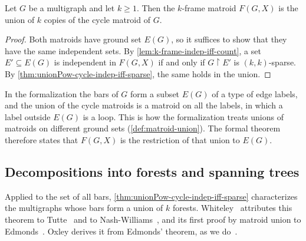 \begin{theorem}
  \label{thm:k-frame-union-cycle}
  \leanok
  Let $G$ be a multigraph and let $k \ge 1$. Then the $k$-frame matroid
  $F(G, X)$ is the union of $k$ copies of the cycle matroid of $G$.
\end{theorem}
\begin{proof}
  \leanok
  Both matroids have ground set $E(G)$, so it suffices to show that they
  have the same independent sets. By \cref{lem:k-frame-indep-iff-count},
  a set $E' \subseteq E(G)$ is independent in $F(G, X)$ if and only if
  $G \restriction E'$ is $(k, k)$-sparse. By
  \cref{thm:unionPow-cycle-indep-iff-sparse}, the same holds in the
  union.
\end{proof}
\begin{fmlnote}
  \label{fmlnote:k-frame-union-restriction}
  In the formalization the bars of $G$ form a subset $E(G)$ of a type
  of edge labels, and the union of the cycle matroids is a matroid on
  all the labels, in which a label outside $E(G)$ is a loop. This is how
  the formalization treats unions of matroids on different ground sets
  (\cref{def:matroid-union}). The formal theorem therefore states that
  $F(G, X)$ is the restriction of that union to $E(G)$.
\end{fmlnote}

\subsection{Decompositions into forests and spanning trees}
\label{sec:body-bar-tree-packing}

Applied to the set of all bars, \cref{thm:unionPow-cycle-indep-iff-sparse}
characterizes the multigraphs whose bars form a union of $k$ forests.
Whiteley~\cite[remark after Corollary~3]{whiteley1988} attributes this
theorem to Tutte~\cite{tutte1961} and to
Nash-Williams~\cite{nashWilliams1961,nashWilliams1964}, and its first
proof by matroid union to Edmonds~\cite{edmonds1965}. Oxley derives it
from Edmonds' theorem, as we do~\cite[Proposition~11.3.14]{oxley2011}.

